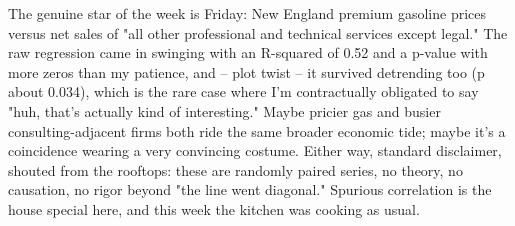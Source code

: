 The genuine star of the week is Friday: New England premium gasoline prices versus net sales of "all other professional and technical services except legal." The raw regression came in swinging with an R-squared of 0.52 and a p-value with more zeros than my patience, and -- plot twist -- it survived detrending too (p about 0.034), which is the rare case where I'm contractually obligated to say "huh, that's actually kind of interesting." Maybe pricier gas and busier consulting-adjacent firms both ride the same broader economic tide; maybe it's a coincidence wearing a very convincing costume. Either way, standard disclaimer, shouted from the rooftops: these are randomly paired series, no theory, no causation, no rigor beyond "the line went diagonal." Spurious correlation is the house special here, and this week the kitchen was cooking as usual.
